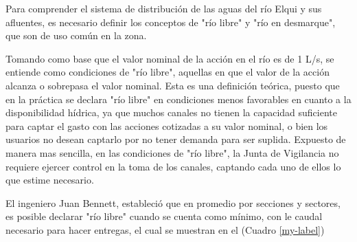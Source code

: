\documentclass[11pt,]{article}
\begin{document}
Para comprender el sistema de distribución de las aguas del río Elqui y sus afluentes, es necesario definir los conceptos de "río libre" y "río en desmarque", que son de uso común en la zona.\bigskip

Tomando como base que el valor nominal de la acción en el río es de 1 L/s, se entiende como condiciones de "río libre", aquellas en que el valor de la acción alcanza o sobrepasa el valor nominal. Esta es una definición teórica, puesto que en la práctica se declara "río libre" en condiciones menos favorables en cuanto a la disponibilidad hídrica, ya que muchos canales no tienen la capacidad suficiente para captar el gasto con las acciones cotizadas a su valor nominal, o bien los usuarios no desean captarlo por no tener demanda para ser suplida. Expuesto de manera mas sencilla, en las condiciones de "río libre", la Junta de Vigilancia no requiere ejercer control en la toma de los canales, captando cada uno de ellos lo que estime necesario.\bigskip

El ingeniero Juan Bennett, estableció que en promedio por secciones y sectores, es posible declarar "río libre" cuando se cuenta como mínimo, con le caudal necesario para hacer entregas, el cual se muestran en el (Cuadro \ref{my-label})

\begin{table}[H]
\centering
\caption{Desmarque mínimo para considerar "río Libre". (DGA, 1995)}
\label{my-label}
\end{table}
\end{document}
